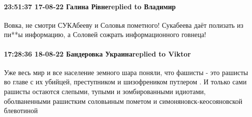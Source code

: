  
 
 
 
 

\paragraph{23:51:37 17-08-22 Галина Рівнеreplied to Владимир}

Вовка, не смотри СУКАбееву и Соловья пометного! Сукабеева даёт полизать из
пи**ы информацию, а Соловей сожрать информационного говнеца!

\paragraph{17:28:36 18-08-22 Бандеровка Украинаreplied to Viktor}

Уже весь мир и все население земного шара поняли, что фашисты - это рашисты во
главе с их убийцей, преступником и шизофреником путлером . И только сами
рашисты остаются слепыми, тупыми и зомбированными идиотами, оболваненными
рашистким соловьиным пометом и симоняновск-кеосояновской блевотиной
